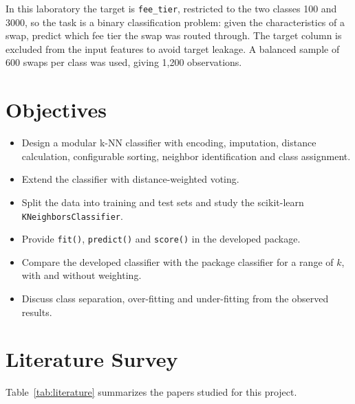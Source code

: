\documentclass[conference]{IEEEtran}
\begin{document}
In this laboratory the target is \texttt{fee\_tier}, restricted to the two classes 100 and 3000, so the task is a binary classification problem: given the characteristics of a swap, predict which fee tier the swap was routed through. The target column is excluded from the input features to avoid target leakage. A balanced sample of 600 swaps per class was used, giving 1,200 observations.


\section{Objectives}

\begin{itemize}

\item Design a modular k-NN classifier with encoding, imputation, distance calculation, configurable sorting, neighbor identification and class assignment.

\item Extend the classifier with distance-weighted voting.

\item Split the data into training and test sets and study the scikit-learn \texttt{KNeighborsClassifier}.

\item Provide \texttt{fit()}, \texttt{predict()} and \texttt{score()} in the developed package.

\item Compare the developed classifier with the package classifier for a range of $k$, with and without weighting.

\item Discuss class separation, over-fitting and under-fitting from the observed results.

\end{itemize}


\section{Literature Survey}

Table~\ref{tab:literature} summarizes the papers studied for this project.
\end{document}
